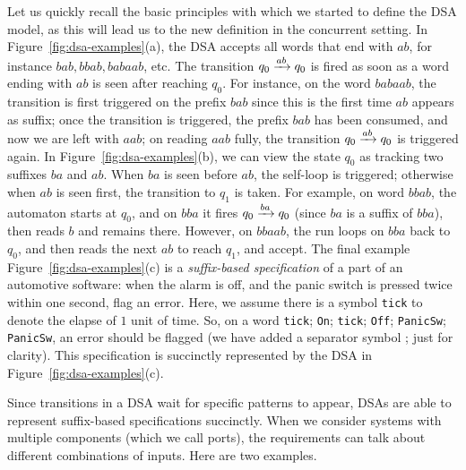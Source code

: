   Let us quickly recall the basic principles with which we started to define the DSA model, as this will lead us to the new definition in the concurrent setting. In Figure~\ref{fig:dsa-examples}(a), the DSA accepts all words that end with $ab$, for instance $bab, bbab, babaab$, etc. The transition $q_0 \xrightarrow{ab} q_0$ is fired as soon as a word ending with $ab$ is seen after reaching $q_0$. For instance, on the word $babaab$, the transition is first triggered on the prefix $bab$ since this is the first time $ab$ appears as suffix; once the transition is triggered, the prefix $bab$ has been consumed, and now we are left with $aab$; on reading $aab$ fully, the transition $q_0 \xrightarrow{ab} q_0$ is triggered again.  In Figure~\ref{fig:dsa-examples}(b), we can view the state $q_0$ as tracking two suffixes $ba$ and $ab$. When $ba$ is seen before $ab$, the self-loop is triggered; otherwise when $ab$ is seen first, the transition to $q_1$ is taken. For example, on word $bbab$, the automaton starts at $q_0$, and on $bba$ it fires $q_0 \xrightarrow{ba} q_0$ (since $ba$ is a suffix of $bba$), then reads $b$ and remains there. %
  However, on $bbaab$, the run loops on $bba$ back to $q_0$, and then reads the next $ab$ to reach $q_1$, and accept. The final example Figure~\ref{fig:dsa-examples}(c) is a \emph{suffix-based specification} of a part of an automotive software: when the alarm is off, and the panic switch is pressed twice within one second, flag an error. Here, we assume there is a symbol \texttt{tick} to denote the elapse of $1$ unit of time. So, on a word \texttt{tick}; \texttt{On}; \texttt{tick}; \texttt{Off}; \texttt{PanicSw}; \texttt{PanicSw}, an error should be flagged (we have added a separator symbol ; just for clarity). This specification is succinctly represented by the DSA in Figure~\ref{fig:dsa-examples}(c).

   Since transitions in a DSA wait for specific patterns to appear, DSAs are able to represent suffix-based specifications succinctly. When we consider systems with multiple components (which we call ports), the requirements can talk about different combinations of inputs. Here are two examples. 

